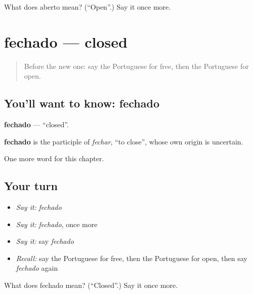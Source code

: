 \begin{tcolorbox}[breakable,colback=teal!4,colframe=teal!35!black,title={Before you move on}]
What does aberto mean? (\textquotedblleft{}Open\textquotedblright{}.) Say it once more.
\end{tcolorbox}
\section[fechado]{fechado — closed}

\label{lesson:PT-C122-fechado}



\begin{quote}
Before the new one: say the Portuguese for free, then the Portuguese for open.
\end{quote}

\subsection*{You'll want to know: fechado}
\textbf{fechado} — \textquotedblleft{}closed\textquotedblright{}.

\begin{cousinweb}
\textbf{fechado} is the participle of \emph{fechar}, \textquotedblleft{}to close\textquotedblright{}, whose own origin is uncertain.
\end{cousinweb}

\begin{grammarlens}[title={What you've built}]
One more word for this chapter.
\end{grammarlens}

\subsection*{Your turn}
\begin{itemize}
\raggedright
  \item \emph{Say it:} \emph{fechado}
  \item \emph{Say it:} \emph{fechado}, once more
  \item \emph{Say it:} say \emph{fechado}
  \item \emph{Recall:} say the Portuguese for free, then the Portuguese for open, then say \emph{fechado} again
\end{itemize}

\begin{tcolorbox}[breakable,colback=teal!4,colframe=teal!35!black,title={Before you move on}]
What does fechado mean? (\textquotedblleft{}Closed\textquotedblright{}.) Say it once more.
\end{tcolorbox}
